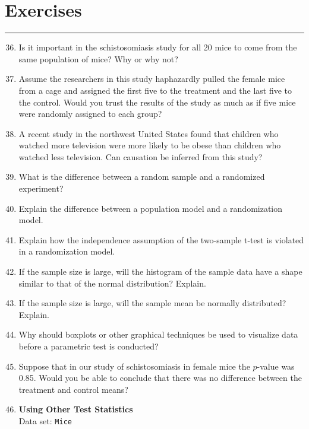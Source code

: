 \documentclass[
]{book}
\begin{document}
\hypertarget{exercises}{%
\section*{Exercises}\label{exercises}}

\vspace{-2em}

\noindent

\rule{\linewidth}{0.4pt}

\begin{enumerate}
  \setcounter{enumi}{35}

  \item Is it important in the schistosomiasis study for all 20 mice to come from the same population of mice? Why or why not?
  \item Assume the researchers in this study haphazardly pulled the female mice from a cage and assigned the first five to the treatment and the last five to the control. Would you trust the results of the study as much as if five mice were randomly assigned to each group?
  \item A recent study in the northwest United States found that children who watched more television were
more likely to be obese than children who watched less television. Can causation be inferred from
this study?
  \item What is the difference between a random sample and a randomized experiment?
  \item Explain the difference between a population model and a randomization model.
  \item Explain how the independence assumption of the two-sample t-test is violated in a randomization model.
  \item If the sample size is large, will the histogram of the sample data have a shape similar to that of the normal distribution? Explain.
  \item If the sample size is large, will the sample mean be normally distributed? Explain.
  \item Why should boxplots or other graphical techniques be used to visualize data before a parametric test
is conducted?
  \item Suppose that in our study of schistosomiasis in female mice the $p$-value was 0.85. Would you be able to conclude that there was no difference between the treatment and control means?
  \item \textbf{Using Other Test Statistics} \\
  Data set: \texttt{Mice} 
  

\end{enumerate}
\end{document}

